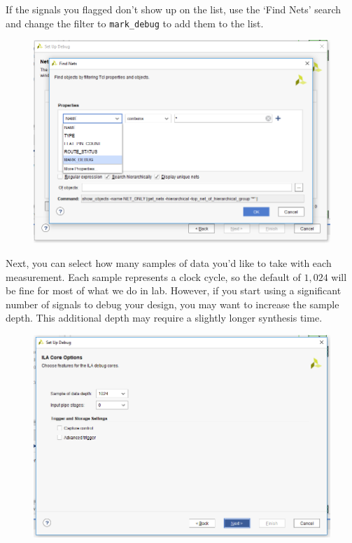 \documentclass{article}
\begin{document}
If the signals you flagged don't show up on the list, use the `Find
Nets' search and change the filter to \verb|mark_debug| to add them to
the list.	
\begin{figure} [h!]
  \centering
  \includegraphics[scale=0.35]{figures/figure2.png}
\end{figure}	
	
Next, you can select how many samples of data you'd like to take with
each measurement.  Each sample represents a clock cycle, so the
default of $1,024$ will be fine for most of what we do in lab. However,
if you start using a significant number of signals to debug your
design, you may want to increase the sample depth. This additional
depth may require a slightly longer synthesis time.
\begin{figure} [h!]
  \centering
  \includegraphics[scale=0.35]{figures/figure3.png}
\end{figure}	
	
\end{document}
